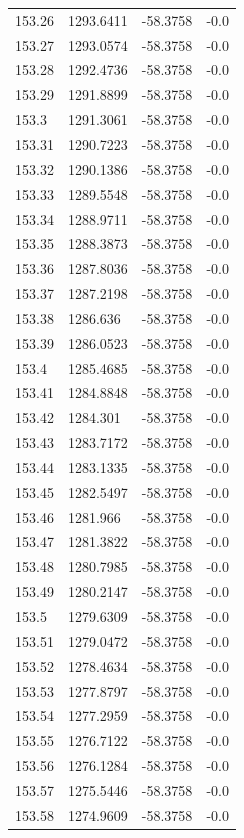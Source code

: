 \begin{table}[H]
\begin{tabular}{llll}
153.26 & 1293.6411 & -58.3758 & -0.0 \\
153.27 & 1293.0574 & -58.3758 & -0.0 \\
153.28 & 1292.4736 & -58.3758 & -0.0 \\
153.29 & 1291.8899 & -58.3758 & -0.0 \\
153.3 & 1291.3061 & -58.3758 & -0.0 \\
153.31 & 1290.7223 & -58.3758 & -0.0 \\
153.32 & 1290.1386 & -58.3758 & -0.0 \\
153.33 & 1289.5548 & -58.3758 & -0.0 \\
153.34 & 1288.9711 & -58.3758 & -0.0 \\
153.35 & 1288.3873 & -58.3758 & -0.0 \\
153.36 & 1287.8036 & -58.3758 & -0.0 \\
153.37 & 1287.2198 & -58.3758 & -0.0 \\
153.38 & 1286.636 & -58.3758 & -0.0 \\
153.39 & 1286.0523 & -58.3758 & -0.0 \\
153.4 & 1285.4685 & -58.3758 & -0.0 \\
153.41 & 1284.8848 & -58.3758 & -0.0 \\
153.42 & 1284.301 & -58.3758 & -0.0 \\
153.43 & 1283.7172 & -58.3758 & -0.0 \\
153.44 & 1283.1335 & -58.3758 & -0.0 \\
153.45 & 1282.5497 & -58.3758 & -0.0 \\
153.46 & 1281.966 & -58.3758 & -0.0 \\
153.47 & 1281.3822 & -58.3758 & -0.0 \\
153.48 & 1280.7985 & -58.3758 & -0.0 \\
153.49 & 1280.2147 & -58.3758 & -0.0 \\
153.5 & 1279.6309 & -58.3758 & -0.0 \\
153.51 & 1279.0472 & -58.3758 & -0.0 \\
153.52 & 1278.4634 & -58.3758 & -0.0 \\
153.53 & 1277.8797 & -58.3758 & -0.0 \\
153.54 & 1277.2959 & -58.3758 & -0.0 \\
153.55 & 1276.7122 & -58.3758 & -0.0 \\
153.56 & 1276.1284 & -58.3758 & -0.0 \\
153.57 & 1275.5446 & -58.3758 & -0.0 \\
153.58 & 1274.9609 & -58.3758 & -0.0 \\

\end{tabular}
\end{table}

